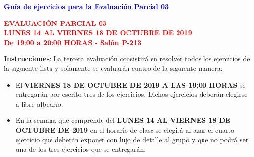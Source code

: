 \documentclass[12pt]{report}
\numberwithin{section}{chapter}
\begin{document}
\begin{center}
\textcolor{blue}{\textbf{\large Guía de ejercicios para la Evaluación Parcial 03}}
\end{center}

\begin{center}
\textcolor{red}{\textbf{\large EVALUACIÓN PARCIAL 03\\
LUNES 14 AL VIERNES 18 DE OCTUBRE DE 2019\\
De 19:00 a 20:00 HORAS - Salón P-213}}
\vspace{0.5 cm}
\end{center}

\textbf{Instrucciones}: La tercera evaluación consistirá en resolver todos los ejercicios de la siguiente lista y solamente se evaluarán cuatro de la siguiente manera:
\begin{itemize}
\item El \textbf{VIERNES 18 DE OCTUBRE DE 2019 A LAS 19:00 HORAS} se entregarán por escrito tres de los ejercicios. Dichos ejercicios deberán elegirse a libre albedrío.
\item En la semana que comprende del \textbf{LUNES 14 AL VIERNES 18 DE OCTUBRE DE 2019} en el horario de clase se elegirá al azar el cuarto ejercicio que deberán exponer con lujo de detalle al grupo y que no podrá ser uno de los tres ejercicios que se entregarán.\\
\end{itemize}
\end{document}
